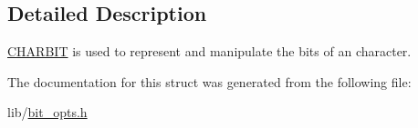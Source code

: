 \subsection{Detailed Description}
\hyperlink{struct_c_h_a_r_b_i_t}{C\-H\-A\-R\-B\-I\-T} is used to represent and manipulate the bits of an character. 

The documentation for this struct was generated from the following file\-:\begin{DoxyCompactItemize}
\item 
lib/\hyperlink{bit__opts_8h}{bit\-\_\-opts.\-h}\end{DoxyCompactItemize}
